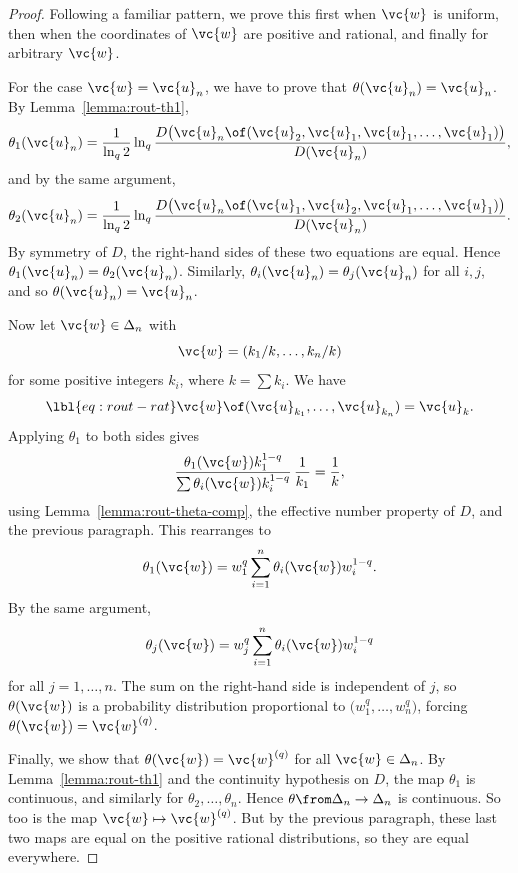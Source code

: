 \begin{proof}
Following a familiar pattern, we prove this first when $\vc{w}$ is uniform,
then when the coordinates of $\vc{w}$ are positive and rational, and
finally for arbitrary $\vc{w}$.

For the case $\vc{w} = \vc{u}_n$, we have to prove that $\theta(\vc{u}_n) =
\vc{u}_n$.  By Lemma~\ref{lemma:rout-th1},
\[
\theta_1(\vc{u}_n)
=
\frac{1}{\ln_q 2}
\ln_q
\frac{D\bigl( 
\vc{u}_n \of (\vc{u}_2, \vc{u}_1, \vc{u}_1, \ldots, \vc{u}_1)
\bigr)}{D(\vc{u}_n)},
\]
and by the same argument,
\[
\theta_2(\vc{u}_n)
=
\frac{1}{\ln_q 2}
\ln_q
\frac{D\bigl( 
\vc{u}_n \of (\vc{u}_1, \vc{u}_2, \vc{u}_1, \ldots, \vc{u}_1)
\bigr)}{D(\vc{u}_n)}.
\]
By symmetry of $D$, the right-hand sides of these two equations are equal.
Hence $\theta_1(\vc{u}_n) = \theta_2(\vc{u}_n)$.  Similarly,
$\theta_i(\vc{u}_n) = \theta_j(\vc{u}_n)$ for all $i, j$, and so
$\theta(\vc{u}_n) = \vc{u}_n$. 

Now let $\vc{w} \in \Delta_n$ with 
\[
\vc{w} = (k_1/k, \ldots, k_n/k)
\]
for some positive integers $k_i$, where $k = \sum k_i$.  We have
% 
\begin{equation}
\lbl{eq:rout-rat}
\vc{w} \of (\vc{u}_{k_1}, \ldots, \vc{u}_{k_n})
=
\vc{u}_k.
\end{equation}
% 
Applying $\theta_1$ to both sides gives
\[
\frac{\theta_1(\vc{w}) k_1^{1 - q}}{\sum \theta_i(\vc{w}) k_i^{1 - q}}
\, \frac{1}{k_1}
=
\frac{1}{k},
\]
using Lemma~\ref{lemma:rout-theta-comp}, the effective number property of
$D$, and the previous paragraph.  This rearranges to
\[
\theta_1(\vc{w}) 
=
w_1^q \sum_{i = 1}^n \theta_i(\vc{w}) w_i^{1 - q}.
\]
By the same argument,
\[
\theta_j(\vc{w})
=
w_j^q \sum_{i = 1}^n \theta_i(\vc{w}) w_i^{1 - q}
\]
for all $j = 1, \ldots, n$.  The sum on the right-hand side is independent
of $j$, so $\theta(\vc{w})$ is a probability distribution proportional to
$\bigl(w_1^q, \ldots, w_n^q\bigr)$, forcing $\theta(\vc{w}) = \vc{w}^{(q)}$. 

Finally, we show that $\theta(\vc{w}) = \vc{w}^{(q)}$ for all $\vc{w} \in
\Delta_n$.  By Lemma~\ref{lemma:rout-th1} and the continuity hypothesis on
$D$, the map $\theta_1$ is continuous, and similarly for $\theta_2, \ldots,
\theta_n$.  Hence $\theta \from \Delta_n \to \Delta_n$ is continuous.  So
too is the map $\vc{w} \mapsto \vc{w}^{(q)}$.  But by the previous
paragraph, these last two maps are equal on the positive rational
distributions, so they are equal everywhere.
\end{proof}

